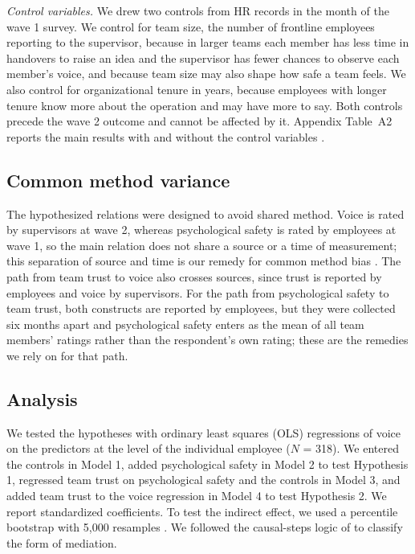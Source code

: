 \documentclass[11pt]{article}
\begin{document}
\textit{Control variables.} We drew two controls from HR records in the month of the wave 1 survey. We control for team size, the number of frontline employees reporting to the supervisor, because in larger teams each member has less time in handovers to raise an idea and the supervisor has fewer chances to observe each member's voice, and because team size may also shape how safe a team feels. We also control for organizational tenure in years, because employees with longer tenure know more about the operation and may have more to say. Both controls precede the wave 2 outcome and cannot be affected by it. Appendix Table~A2 reports the main results with and without the control variables \citep{becker2016, bernerth2016}.

\subsection{Common method variance}

The hypothesized relations were designed to avoid shared method. Voice is rated by supervisors at wave 2, whereas psychological safety is rated by employees at wave 1, so the main relation does not share a source or a time of measurement; this separation of source and time is our remedy for common method bias \citep{podsakoff2003, podsakoff2012}. The path from team trust to voice also crosses sources, since trust is reported by employees and voice by supervisors. For the path from psychological safety to team trust, both constructs are reported by employees, but they were collected six months apart and psychological safety enters as the mean of all team members' ratings rather than the respondent's own rating; these are the remedies we rely on for that path.

\subsection{Analysis}

We tested the hypotheses with ordinary least squares (OLS) regressions of voice on the predictors at the level of the individual employee ($N$ = 318). We entered the controls in Model 1, added psychological safety in Model 2 to test Hypothesis 1, regressed team trust on psychological safety and the controls in Model 3, and added team trust to the voice regression in Model 4 to test Hypothesis 2. We report standardized coefficients. To test the indirect effect, we used a percentile bootstrap with 5,000 resamples \citep{preacher2008}. We followed the causal-steps logic of \citet{baron1986} to classify the form of mediation.
\end{document}
